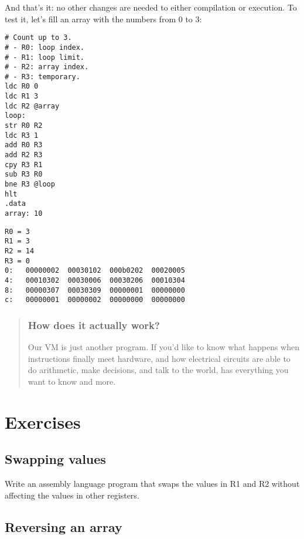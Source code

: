 \documentclass[krantzl]{krantz}
\newenvironment{callout}{\savenotes\begin{tBox}\begin{quotation}\toggletrue{inbox}\renewcommand{\thempfootnote}{\arabic{footnote}}}{\end{quotation}\vspace{\baselineskip}\end{tBox}\togglefalse{inbox}\spewnotes}
\begin{document}
And that's it:
no other changes are needed to either compilation or execution.
To test it,
let's fill an array with the numbers from 0 to 3:


\begin{lstlisting}[frame=single,frameround=tttt]
# Count up to 3.
# - R0: loop index.
# - R1: loop limit.
# - R2: array index.
# - R3: temporary.
ldc R0 0
ldc R1 3
ldc R2 @array
loop:
str R0 R2
ldc R3 1
add R0 R3
add R2 R3
cpy R3 R1
sub R3 R0
bne R3 @loop
hlt
.data
array: 10
\end{lstlisting}



\begin{lstlisting}[frame=single,frameround=tttt]
R0 = 3
R1 = 3
R2 = 14
R3 = 0
0:   00000002  00030102  000b0202  00020005
4:   00010302  00030006  00030206  00010304
8:   00000307  00030309  00000001  00000000
c:   00000001  00000002  00000000  00000000
\end{lstlisting}


\begin{callout}


\subsubsection*{How does it actually work?}


Our VM is just another program.
If you'd like to know what happens when instructions finally meet hardware,
and how electrical circuits are able to do arithmetic,
make decisions,
and talk to the world,
\cite{Patterson2017} has everything you want to know and more.

\end{callout}


\section{Exercises}\label{virtual-machine-exercises}

\subsection*{Swapping values}


Write an assembly language program that swaps the values in R1 and R2
without affecting the values in other registers.

\subsection*{Reversing an array}
\end{document}
